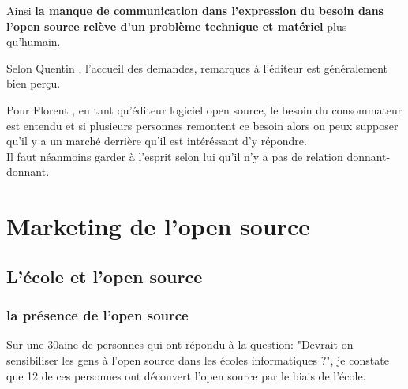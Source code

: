 			Ainsi \textbf{la manque de communication dans l'expression du besoin dans l'open source relève d'un problème technique et matériel} plus qu'humain.

			\newpage

			Selon Quentin , l'accueil des demandes, remarques à l'éditeur est généralement bien perçu.

			\begin{center}
				\textit{
				}
			\end{center}

			Pour Florent , en tant qu'éditeur logiciel open source, le besoin du consommateur est entendu et si plusieurs personnes remontent ce besoin alors on peux supposer qu'il y a un marché derrière qu'il est intéréssant d'y répondre.\\

			Il faut néanmoins garder à l'esprit selon lui qu'il n'y a pas de relation donnant-donnant.

			\begin{center}
				\textit{
				}
			\end{center}


	\section{Marketing de l'open source}

		\subsection{L'école et l'open source}

			\subsubsection{la présence de l'open source}

				Sur une 30aine de personnes qui ont répondu à la question: "Devrait on sensibiliser les gens à l'open source dans les écoles informatiques ?", je constate que 12 de ces personnes ont découvert l'open source par le biais de l'école.

